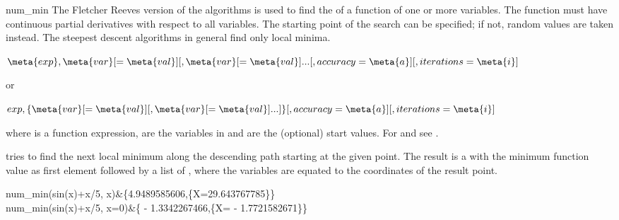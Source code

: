 \begin{Operator}{num_min}
The Fletcher Reeves version of the 
algorithms is used to find the  of a
function of one or more variables. The
function must have continuous partial derivatives with respect to all
variables. The starting point of the search can be
specified; if not, random values are taken instead.
The steepest descent algorithms in general find only local
minima.
 
\begin{Syntax}

 \(\meta{exp}, 
     \meta{var}[=\meta{val}] [,\meta{var}[=\meta{val}] ...
             [,accuracy=\meta{a}] [,iterations=\meta{i}]\) 


or

 \(exp, \{ 
      \meta{var}[=\meta{val}] [,\meta{var}[=\meta{val}] ...] \}
             [,accuracy=\meta{a}] [,iterations=\meta{i}]\) 
\end{Syntax}

where  is a function expression,
 are the variables in  and
 are the (optional) start values.
For  and  see .

 tries to find the next local minimum along the descending
path starting at the given point. The result is a 
with the minimum function value as first element followed by a list
of , where the variables are equated to the coordinates 
of the result point.


\begin{Examples}
num_min(sin(x)+x/5, x)&\{4.9489585606,\{X=29.643767785\}\}\\
num_min(sin(x)+x/5, x=0)&\{ - 1.3342267466,\{X= - 1.7721582671\}\}
\end{Examples}
\end{Operator}


